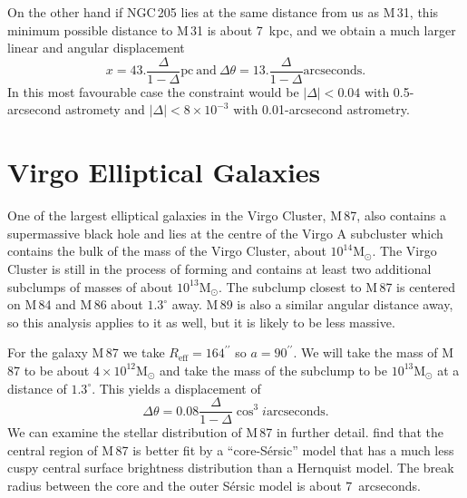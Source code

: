 \documentclass[useAMS,usenatbib]{mn2e}
\newcommand{\msun}{\mathrm{M}_\odot}
\begin{document}
On the other hand if NGC\,205 lies at the same distance from us as
M\,31, this minimum possible distance to M\,31 is about 7~kpc, and we
obtain a much larger linear and angular displacement
\begin{equation}
  x = 43. \frac{\Delta}{1-\Delta} \mathrm{pc} ~\mathrm{and}~
  \Delta \theta = 13. \frac{\Delta}{1-\Delta} \mathrm{arcseconds}.
\end{equation}
In this most favourable case the constraint would be $|\Delta| < 0.04$
with 0.5-arcsecond astromety and $|\Delta|<8\times 10^{-3}$ with
0.01-arcsecond astrometry.

\section{Virgo Elliptical Galaxies}

One of the largest elliptical galaxies in the Virgo Cluster, M\,87,
also contains a supermassive black hole and lies at the centre of the
Virgo A subcluster which contains the bulk of the mass of the Virgo
Cluster, about $10^{14} \msun$.  The Virgo Cluster is still in the
process of forming and contains at least two additional subclumps of
masses of about $10^{13} \msun$.  The subclump closest to M\,87 is
centered on M\,84 and M\,86 about $1.3^\circ$ away.  M\,89 is also a
similar angular distance away, so this analysis applies to it as well,
but it is likely to be less massive.

For the galaxy M\,87 we take $R_\mathrm{eff}=164^{\prime\prime}$
\citep{2006ApJS..164..334F} so $a=90^{\prime\prime}$.  We will take
the mass of M\,87 to be about $4\times 10^{12} \msun$
\citep{2006ApJ...643..210W} and take the mass of the subclump to be
$10^{13} \msun$ at a distance of $1.3^\circ$. This yields a
displacement of
\begin{equation}
  \Delta \theta = 0.08 \frac{\Delta}{1-\Delta} \cos^3 i
  \mathrm{arcseconds}.
  \label{eq:16}
\end{equation}
We can examine the stellar distribution of M\,87 in further detail.
\citet{2006ApJS..164..334F} find that the central region of M\,87 is
better fit by a ``core-S\'ersic'' model
\citep{1968adga.book.....S,2004AJ....127.1917T} that has a much less
cuspy central surface brightness distribution than a Hernquist model.
The break radius between the core and the outer S\'ersic model is
about 7~arcseconds.
\end{document}
